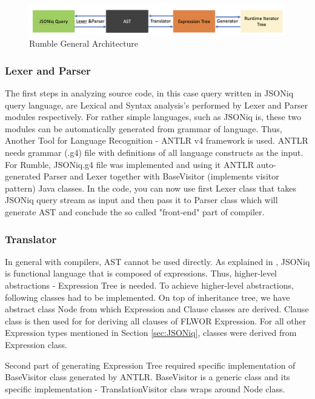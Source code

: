 \begin{figure}[h!]
	\includegraphics[width=\linewidth]{parsing_architecture.png}
	\vspace*{-5mm}
	\caption{Rumble General Architecture}
	\label{fig:Rumble_General_Architecture}
\end{figure}

\subsubsection{Lexer and Parser}
The first steps in analyzing source code, in this case query written in JSONiq query language, are Lexical and Syntax analysis's performed by Lexer and Parser modules respectively. For rather simple languages, such as JSONiq is, these two modules can be automatically generated from grammar of language. Thus, Another Tool for Language Recognition - ANTLR v4 framework \cite{ANTLR} is used. ANTLR needs grammar (.g4) file with definitions of all language constructs as the input. For Rumble, JSONiq.g4 file was implemented and using it ANTLR auto-generated Parser and Lexer together with BaseVisitor (implements visitor pattern) Java classes. In the code, you can now use first Lexer class that takes JSONiq query stream as input and then pass it to Parser class which will generate AST and conclude the so called "front-end" part of compiler.

\subsubsection{Translator}
In general with compilers, AST cannot be used directly. As explained in \cite{RumbleMLThesis}, JSONiq is functional language that is composed of expressions. Thus, higher-level abstractions - Expression Tree is needed. To achieve higher-level abstractions, following classes had to be implemented. On top of inheritance tree, we have abstract class Node from which Expression and Clause classes are derived. Clause class is then used for for deriving all clauses of FLWOR Expression. For all other Expression types mentioned in Section \ref{sec:JSONiq}, classes were derived from Expression class. 

Second part of generating Expression Tree required specific implementation of BaseVisitor class generated by ANTLR. BaseVisitor is a generic class and its specific implementation - TranslationVisitor class wraps around Node class. 

